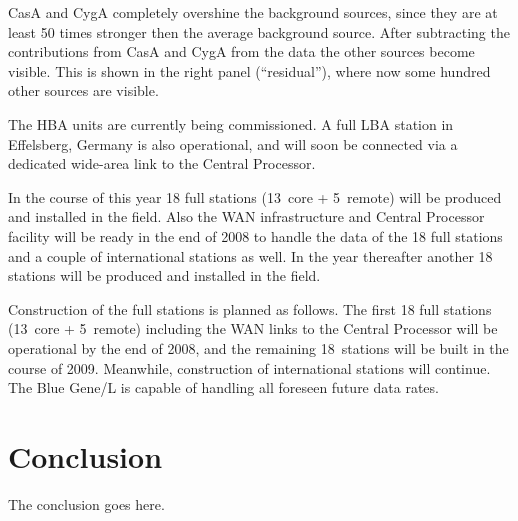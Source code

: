 \documentclass[journal]{IEEEtran}
\begin{document}
CasA and CygA completely overshine the background sources, since they are at least 50 times stronger then the average background source. After subtracting the contributions from CasA and CygA from the data the other sources become visible. This is shown in the right panel (``residual''), where now some hundred other sources are visible. 

The HBA units are currently being commissioned.
A full LBA station in Effelsberg, Germany is also operational, and will soon
be connected via a dedicated wide-area link to the Central Processor.

In the course of this year 18 full stations (13~core + 5~remote) will be produced and installed in the field. Also the WAN infrastructure and Central Processor facility will be ready in the end of 2008 to handle the data of the 18 full stations and a couple of international stations as well. In the year thereafter another 18 stations will be produced and installed in the field.

Construction of the full stations is planned as follows.
The first 18 full stations (13~core + 5~remote) 
including the WAN links to the Central Processor will be operational by the
end of 2008, and the remaining 18~stations will be built in the course of 2009.
Meanwhile, construction of international stations will continue.
The Blue Gene/L is capable of handling all foreseen future data rates.


\section{Conclusion}
The conclusion goes here.






%
\end{document}
